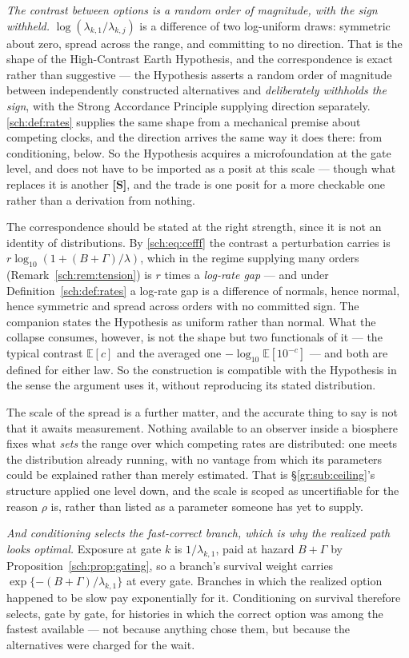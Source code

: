 \documentclass[11pt]{article}
\numberwithin{equation}{section}
\theoremstyle{plain}
\theoremstyle{definition}
\theoremstyle{remark}
\newcommand{\E}{\mathbb{E}}
\begin{document}
\emph{The contrast between options is a random order of magnitude, with
the sign withheld.} $\log(\lambda_{k,1}/\lambda_{k,j})$ is a difference
of two log-uniform draws: symmetric about zero, spread across the range,
and committing to no direction. That is the shape of the High-Contrast
Earth Hypothesis, and the correspondence is exact rather than
suggestive --- the Hypothesis asserts a random order of magnitude between
independently constructed alternatives and \emph{deliberately withholds
the sign}, with the Strong Accordance Principle supplying direction
separately. \eqref{sch:def:rates} supplies the same shape from a
mechanical premise about competing clocks, and the direction arrives the
same way it does there: from conditioning, below. So the Hypothesis
acquires a microfoundation at the gate level, and does not have to be
imported as a posit at this scale --- though what replaces it is another
\textbf{[S]}, and the trade is one posit for a more checkable one rather
than a derivation from nothing.

The correspondence should be stated at the right strength, since it is
not an identity of distributions. By \eqref{sch:eq:cefff} the contrast a
perturbation carries is $r\log_{10}(1+(B+\Gamma)/\lambda)$, which in the
regime supplying many orders (Remark~\ref{sch:rem:tension}) is $r$ times
a \emph{log-rate gap} --- and under Definition~\ref{sch:def:rates} a
log-rate gap is a difference of normals, hence normal, hence symmetric
and spread across orders with no committed sign. The companion states
the Hypothesis as uniform rather than normal. What the collapse
consumes, however, is not the shape but two functionals of it --- the
typical contrast $\E[c]$ and the averaged one
$-\log_{10}\E[10^{-c}]$ --- and both are defined for either law. So the
construction is compatible with the Hypothesis in the sense the argument
uses it, without reproducing its stated distribution.

The scale of the spread is a further matter, and the accurate thing to say is not that it awaits measurement. Nothing available to an observer
inside a biosphere fixes what \emph{sets} the range over which competing
rates are distributed: one meets the distribution already running, with
no vantage from which its parameters could be explained rather than
merely estimated. That is \S\ref{gr:sub:ceiling}'s structure applied one
level down, and the scale is scoped as uncertifiable for the reason
$\rho$ is, rather than listed as a parameter someone has yet to
supply.

\emph{And conditioning selects the fast-correct branch, which is why the
realized path looks optimal.} Exposure at gate $k$ is $1/\lambda_{k,1}$,
paid at hazard $B+\Gamma$ by Proposition~\ref{sch:prop:gating}, so a
branch's survival weight carries $\exp\{-(B+\Gamma)/\lambda_{k,1}\}$ at
every gate. Branches in which the realized option happened to be slow
pay exponentially for it. Conditioning on survival therefore selects,
gate by gate, for histories in which the correct option was among the
fastest available --- not because anything chose them, but because the
alternatives were charged for the wait.
\end{document}
